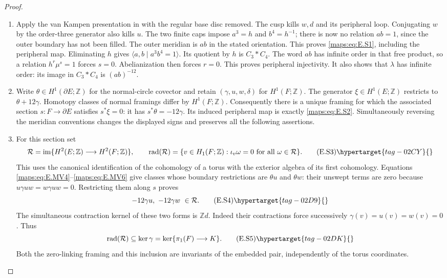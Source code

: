 \begin{proof}
\begin{enumerate}[label={$\langle1\rangle$\arabic*.},leftmargin=*]
\item Apply the van Kampen presentation in  with the regular base disc
removed. The cusp kills $w,d$ and its peripheral loop. Conjugating
$w$ by the order-three generator also kills $u$. The two finite caps
impose $a^3=h$ and $b^4=h^{-1}$; there is now no relation $ab=1$,
since the outer boundary has not been filled. The outer meridian
is $ab$ in the stated orientation. This proves \eqref{maps:eq:E.S1}, including the peripheral map. Eliminating $h$ gives $\langle a,b\mid a^3b^4=1\rangle$.
Its quotient by $h$ is $C_3*C_4$. The word $ab$ has infinite order
in that free product, so a relation $h^r\mu^s=1$ forces $s=0$.
Abelianization then forces $r=0$. This proves peripheral injectivity.
It also shows that $\lambda$ has infinite order: its image in
$C_3*C_4$ is $(ab)^{-12}$.

\item Write $\theta\in H^1(\partial E;\mathbb Z)$ for the normal-circle
covector and retain $(\gamma,u,w,\delta)$ for $H^1(F;\mathbb Z)$.
The generator $\xi\in H^1(E;\mathbb Z)$ restricts to
$\theta+12\gamma$. Homotopy classes of normal framings differ by
$H^1(F;\mathbb Z)$. Consequently there is a unique framing for
which the associated section $s:F\to\partial E$ satisfies
$s^*\xi=0$: it has $s^*\theta=-12\gamma$. Its induced peripheral
map is exactly \eqref{maps:eq:E.S2}. Simultaneously reversing the meridian
conventions changes the displayed signs and preserves all the
following assertions.

\item For this section set
\[
 \mathcal R=\operatorname{im}\{H^2(E;\mathbb Z)
                         \longrightarrow H^2(F;\mathbb Z)\},
 \qquad
 \operatorname{rad}(\mathcal R)=
 \{v\in H_1(F;\mathbb Z):\iota_v\omega=0
                                    \text{ for all }\omega\in\mathcal R\}.
 \tag{E.S3}\hypertarget{tag-02CY}{}\label{maps:eq:E.S3}
\]
This uses the canonical identification of the cohomology of a torus
with the exterior algebra of its first cohomology. Equations
\eqref{maps:eq:E.MV4}--\eqref{maps:eq:E.MV6} give classes whose boundary restrictions are
$\theta u$ and $\theta w$: their unswept terms are zero because
$u\gamma uw=w\gamma uw=0$. Restricting them along $s$ proves
\[
                -12\gamma u,\ -12\gamma w\ \in\mathcal R.
 \tag{E.S4}\hypertarget{tag-02D9}{}\label{maps:eq:E.S4}
\]
The simultaneous contraction kernel of these two forms is
$\mathbb Z d$. Indeed their contractions force successively
$\gamma(v)=u(v)=w(v)=0$. Thus
\[
       \operatorname{rad}(\mathcal R)\subseteq\ker\gamma
        =\ker\{\pi_1(F)\longrightarrow K\}.
 \tag{E.S5}\hypertarget{tag-02DK}{}\label{maps:eq:E.S5}
\]
Both the zero-linking framing and this inclusion are invariants of
the embedded pair, independently of the torus coordinates.


\end{enumerate}
\end{proof}
